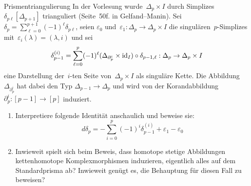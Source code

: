 \documentclass{uebblatt}
\begin{document}

\begin{aufgabe}{Prismentriangulierung}
In der Vorlesung wurde~$\Delta_p \times I$ durch
Simplizes~$\delta_{p\ell}[\Delta_{p+1}]$ trianguliert (Seite~50f. in
Gelfand--Manin). Sei~$\delta_p = \sum_{\ell=0}^{p+1}
(-1)^\ell \delta_{p\ell}$, seien $\varepsilon_0$ und~$\varepsilon_1 : \Delta_p \to
\Delta_p \times I$ die singulären~$p$-Simplizes
mit~$\varepsilon_i(\lambda) = (\lambda,i)$ und sei
\[ \delta^{(i)}_{p-1} = \sum_{\ell = 0}^p (-1)^\ell
  (\Delta_{\partial^i_p} \times \mathrm{id}_I) \circ \delta_{p-1,\ell} :
  \Delta_p \to \Delta_p \times I \]
eine Darstellung der~$i$-ten Seite von~$\Delta_p \times I$ als singuläre Kette.
Die Abbildung $\Delta_{\partial^i_p}$ hat dabei den Typ $\Delta_{p-1} \to
\Delta_p$ und wird von der Korandabbildung~$\partial^i_p : [p-1] \to [p]$ induziert.

\begin{enumerate}
\item Interpretiere folgende Identität anschaulich und beweise sie:
\[ d \delta_p = -\sum_{i=0}^p (-1)^i \delta_{p-1}^{(i)} + \varepsilon_1 -
\varepsilon_0 \]

\item Inwieweit spielt sich beim Beweis, dass homotope stetige Abbildungen
kettenhomotope Komplexmorphismen induzieren, eigentlich alles auf dem
Standardprisma ab? Inwieweit genügt es, die Behauptung für diesen Fall zu
beweisen?
\end{enumerate}
\end{aufgabe}
\end{document}
